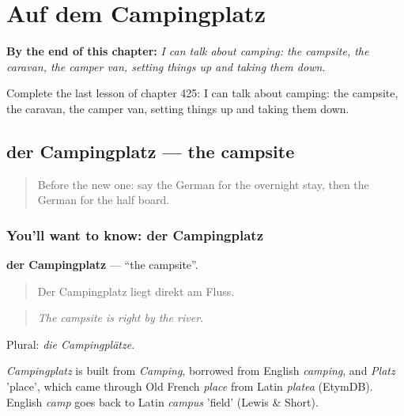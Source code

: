 
\chapter{Auf dem Campingplatz}
\label{ch:ge-auf-dem-campingplatz}

\begin{chapteropening}
\textbf{By the end of this chapter:} \emph{I can talk about camping: the campsite, the caravan, the camper van, setting things up and taking them down.}

Complete the last lesson of chapter 425: I can talk about camping: the campsite, the caravan, the camper van, setting things up and taking them down.
\end{chapteropening}

\section[der Campingplatz]{der Campingplatz — the campsite}

\label{lesson:GE-C425-campingplatz}



\begin{quote}
Before the new one: say the German for the overnight stay, then the German for the half board.
\end{quote}

\subsection*{You'll want to know: der Campingplatz}
\textbf{der Campingplatz} — \textquotedblleft{}the campsite\textquotedblright{}.

\begin{quote}
Der Campingplatz liegt direkt am Fluss.
\end{quote}

\begin{quote}
\emph{The campsite is right by the river.}
\end{quote}

Plural: \emph{die Campingplätze}.

\begin{cousinweb}
\emph{Campingplatz} is built from \emph{Camping}, borrowed from English \emph{camping}, and \emph{Platz} 'place', which came through Old French \emph{place} from Latin \emph{platea} (EtymDB). English \emph{camp} goes back to Latin \emph{campus} 'field' (Lewis \& Short).
\end{cousinweb}

